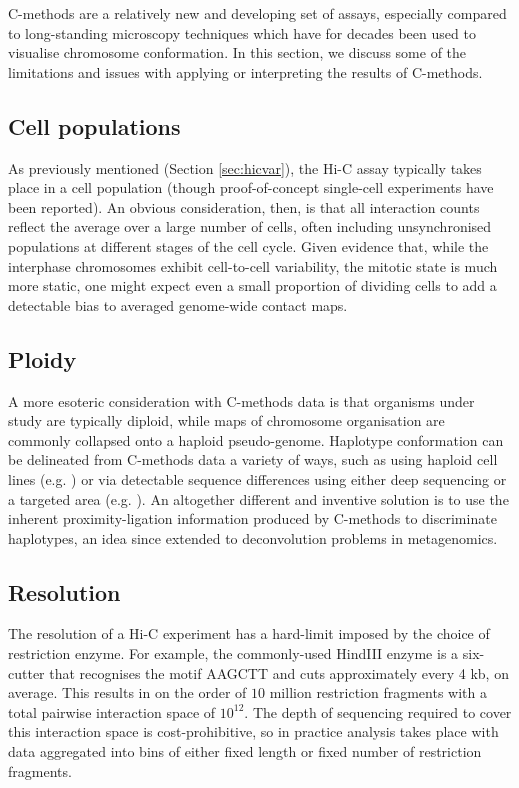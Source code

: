 \documentclass[a4paper,11pt,oneside]{book}
\begin{document}
C-methods are a relatively new and developing set of assays, especially compared to long-standing microscopy techniques which have for decades been used to visualise chromosome conformation. In this section, we discuss some of the limitations and issues with applying or interpreting the results of C-methods.

\subsection{Cell populations}
As previously mentioned (Section \ref{sec:hicvar}), the Hi-C assay typically takes place in a cell population (though proof-of-concept single-cell experiments have been reported\cite{Nagano2013}). An obvious consideration, then, is that all interaction counts reflect the average over a large number of cells, often including unsynchronised populations at different stages of the cell cycle.\cite{Fraser2015} Given evidence that, while the interphase chromosomes exhibit cell-to-cell variability, the mitotic state is much more static,\cite{Naumova2013, Dekker2014} one might expect even a small proportion of dividing cells to add a detectable bias to averaged genome-wide contact maps.

\subsection{Ploidy}
A more esoteric consideration with C-methods data is that organisms under study are typically diploid, while maps of chromosome organisation are commonly collapsed onto a haploid pseudo-genome. Haplotype conformation can be delineated from C-methods data a variety of ways, such as using haploid cell lines (e.g. ) or via detectable sequence differences using either deep sequencing or a targeted area (e.g. ). An altogether different and inventive solution is to use the inherent proximity-ligation information produced by C-methods to discriminate haplotypes,\cite{Selvaraj2013a} an idea since extended to deconvolution problems in metagenomics.\cite{Burton2014, Beitel2014}

\subsection{Resolution}
The resolution of a Hi-C experiment has a hard-limit imposed by the choice of restriction enzyme. For example, the commonly-used HindIII enzyme is a six-cutter that recognises the motif AAGCTT and cuts approximately every 4 kb, on average.\cite{DeWit2012} This results in on the order of $10$ million restriction fragments with a total pairwise interaction space of $10^{12}$.\cite{Lajoie2014} The depth of sequencing required to cover this interaction space is cost-prohibitive, so in practice analysis takes place with data aggregated into bins of either fixed length or fixed number of restriction fragments. 
\end{document}
